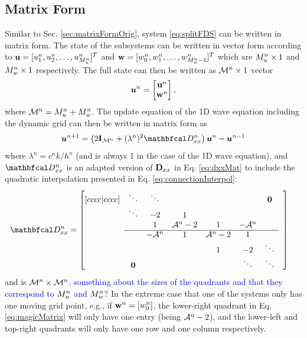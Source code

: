 \documentclass[fleqn]{jaes}
\def\SWcomment[#1]{\textcolor{blue}{#1}}
\begin{document}
\subsection{Matrix Form}\label{sec:matrixForm}
Similar to Sec. \ref{sec:matrixFormOrig}, system \eqref{eq:splitFDS} can be written in matrix form. The state of the subsystems can be written in vector form according to $\mathbf{u} = [u_1^n, u_2^n, \hdots, u_{M_u^n}^n]^T$ and $\mathbf{w} = [w_0^n, w_1^n, \hdots, w_{M_w^n-1}^n]^T$ which are $M_u^n \times 1$ and $M_w^n \times 1$ respectively. The full state can then be written as ${\mathcal{M}^n} \times 1$ vector
\begin{equation}\label{eq:uStack}
    \uStack^n = \begin{bmatrix}
    \u^n\\
    \w^n
    \end{bmatrix},
\end{equation}
where ${\mathcal{M}^n} = M_u^n + M_w^n$.
The update equation of the 1D wave equation including the dynamic grid can then be written in matrix form as
\begin{equation}\label{eq:1DwaveDynMatrix}
    \uStack^{n+1} = \left(2\I_\MoneD + (\lambda^n)^2\DDxx\right)\uStack^n - \uStack^{n-1} 
\end{equation}
where $\lambda^n = c^nk/h^n$ (and is always 1 in the case of the 1D wave equation), and $\DDxx$ is an adapted version of $\mathbf{D}_{xx}$ in Eq. \eqref{eq:dxxMat} to include the quadratic interpolation presented in Eq. \eqref{eq:connectionInterpol}:
\begin{equation}\label{eq:magicMatrix}
    \!\!\!\!\!\!\DDxx = \begin{bmatrix}[cccc|cccc]
     & \ddots  &\ddots & & & & \boldsymbol{0} & \\
       & \ddots & -2 & 1 & & & & \\
      & & 1 & \Aterm -2 & 1 & -\Aterm & \\ \cline{2-7}
      & & -\Aterm & 1 & \Aterm -2 & 1 & & \\
         & & & &1 & -2 & \ddots  \\
         & \boldsymbol{0} & &  &  &\ddots & \ddots &
    \end{bmatrix}
\end{equation}
and is ${\mathcal{M}^n} \times {\mathcal{M}^n}$. \SWcomment[something about the sizes of the quadrants and that they correspond to $M_u^n$ and $M_w^n$?] In the extreme case that one of the systems only has one moving grid point, e.g., if $\mathbf{w}^n =[w_0^n]$, the lower-right quadrant in Eq. \eqref{eq:magicMatrix} will only have one entry (being $\mathcal{A}^n-2$), and the lower-left and top-right quadrants will only have one row and one column respectively. 
\end{document}
